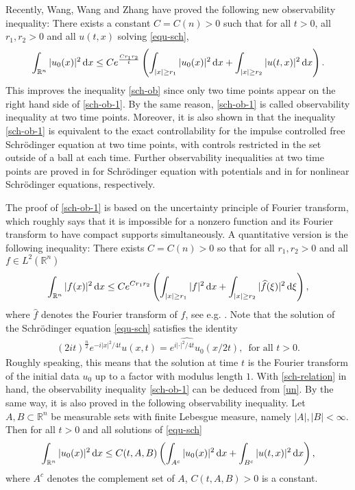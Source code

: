\documentclass[12pt]{amsart}
\def\R {\mathbb{R}}
\def\d{{\,\rm d}}
\theoremstyle{definition}
\numberwithin{equation}{section}
\begin{document}
Recently,   Wang,  Wang and Zhang \cite{WWZ} have proved   the following new observability inequality: There exists a constant $C=C(n)>0$ such that for all $t>0$, all $r_1,r_2>0$ and all $u(t,x)$ solving \eqref{equ-sch},
\begin{equation}\label{sch-ob-1}
    \int_{\R^n}|u_0(x)|^2\d x \le C e^{\frac{Cr_1r_2}{t}}\left(\int_{|x|\ge r_1} |u_0(x)|^2\d x+\int _{|x|\ge r_2}|u(t,x)|^2\d x\right).
\end{equation}
This improves the inequality \eqref{sch-ob} since only two time points appear on the right hand side of \eqref{sch-ob-1}. By the same reason, \eqref{sch-ob-1} is called observability inequality at two time points. Moreover, it is also shown in \cite[Section 5.2]{WWZ} that the inequality \eqref{sch-ob-1} is equivalent to the exact controllability for the impulse controlled
free Schr\"{o}dinger equation at two time points, with controls restricted in the set outside of a ball at each time. Further observability inequalities at two time points are proved in \cite{Huang} for Schr\"{o}dinger equation with potentials and in \cite{wang21} for nonlinear Schr\"{o}dinger equations, respectively.

The proof of \eqref{sch-ob-1} is based on the uncertainty principle of Fourier transform, which roughly says that  it is impossible for a nonzero function and its Fourier transform to have compact supports simultaneously.
A quantitative version is the following inequality: There exists $C=C(n)>0$ so that for all $r_1,r_2>0$ and all $f\in L^2(\R^n)$
\begin{equation}\label{un}
    \int_{\R^n}|f(x)|^2\d x\le Ce^{Cr_1r_2}\left(\int_{|x|\ge r_1}|f|^2\d x+\int_{|x|\ge r_2}|\widehat{f}(\xi)|^2\d\xi\right),
\end{equation}
where $\widehat{f}$ denotes the Fourier transform of $f$, see e.g. \cite{Nazarov,Havin,Jaming}. Note that \cite{L-Ponce14} the solution of the Schr\"{o}dinger equation \eqref{equ-sch} satisfies the identity
\begin{align}\label{sch-relation}
(2it)^{\frac{n}{2}}e^{-i|x|^2/4t}u(x, t)=\widehat{e^{i|\cdot|^2/4t}u_0}(x/2t),\,\,\, \text{for all}\,\,t>0.
\end{align}
Roughly speaking, this means that the solution at time $t$ is the Fourier transform of the initial data $u_0$ up to a factor with modulus length $1$. With \eqref{sch-relation} in hand, the observability inequality \eqref{sch-ob-1} can be deduced from \eqref{un}. By the same way, it is also proved in \cite{WWZ} the following observability inequality. Let $A,B\subset \R^n$ be measurable sets with finite Lebesgue measure, namely $|A|,|B|<\infty$. Then for all $t>0$ and all solutions of \eqref{equ-sch}
\begin{equation}\label{sch-ob-2}
    \int_{\R^n}|u_0(x)|^2\d x \le C(t,A,B)\left(\int_{A^c} |u_0(x)|^2\d x+\int _{B^c}|u(t,x)|^2\d x\right),
\end{equation}
where $A^c$ denotes the complement set of $A$, $C(t,A,B)>0$ is a constant.
\end{document}
